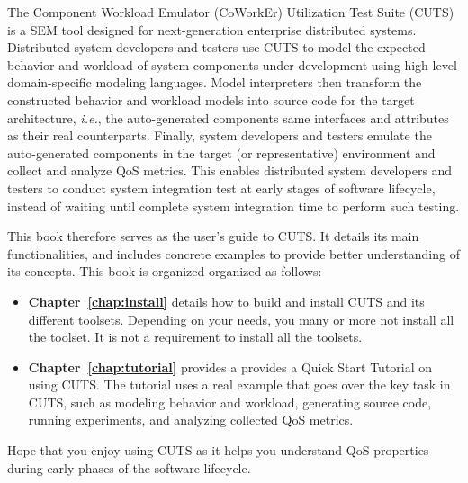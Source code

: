 The Component Workload Emulator (CoWorkEr) Utilization Test Suite 
(CUTS) is a SEM tool designed for next-generation enterprise
distributed systems. Distributed system developers and testers 
use CUTS to model the expected behavior and workload of system 
components under development using high-level domain-specific 
modeling languages. Model interpreters then transform the 
constructed behavior and workload models into source code 
for the target architecture, \textit{i.e.}, the auto-generated 
components same interfaces and attributes as their real counterparts. 
Finally, system developers and testers emulate the auto-generated 
components in the target (or representative) environment and 
collect and analyze QoS metrics. This enables distributed system 
developers and testers to conduct system integration test at 
early stages of software lifecycle, instead of waiting until 
complete system integration time to perform such testing.


This book therefore serves as the user's guide to CUTS. It details
its main functionalities, and includes concrete examples to provide
better understanding of its concepts. This book is organized 
organized as follows: 
\begin{itemize}
  \item \textbf{Chapter~\ref{chap:install}} details how to build 
  and install CUTS and its different toolsets. Depending on your 
  needs, you many or more not install all the toolset. It is not a 
  requirement to install all the toolsets. 
  
  \item \textbf{Chapter~\ref{chap:tutorial}} provides a provides 
  a Quick Start Tutorial on using CUTS. The tutorial uses a real
  example that goes over the key task in CUTS, such as modeling
  behavior and workload, generating source code, running experiments,
  and analyzing collected QoS metrics.
  
\end{itemize}

Hope that you enjoy using CUTS as it helps you understand QoS
properties during early phases of the software lifecycle.


